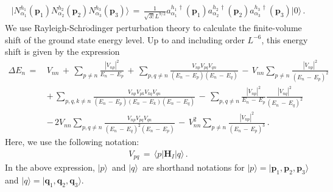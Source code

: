 \documentclass[12pt,prd,tightenlines,nofootinbib]{revtex4-2}
\begin{document}
\begin{align}
  \big| N^{h_{1}}_{\alpha_{1}}(\textbf{p}_{1})N^{h_{2}}_{\alpha_{2}}(\textbf{p}_{2})
  N^{h_{3}}_{\alpha_{3}}(\textbf{p}_{3})\big\rangle \, =\, \frac{1}{\sqrt{3!}L^{9/2}}
  a^{h_{1}\,\dagger}_{\alpha_{1}}(\textbf{p}_{1})a^{h_{2}\,\dagger}_{\alpha_{2}}(\textbf{p}_{2})a^{h_{3}\,\dagger}_{\alpha_{3}}(\textbf{p}_{3})\big| 0 \big\rangle\,.
\end{align}
We use Rayleigh-Schr$\ddot{\text{o}}$dinger perturbation theory to calculate
the finite-volume shift of the ground state energy level. Up to and including
order $L^{-6}$, this energy shift is given by the expression
\begin{align}
    \Delta E_{n}\, =\, &V_{nn}\, + \, \sum_{p \neq n} \frac{|V_{np}|^{2}}{E_{n} \, -\, E_{p}} \, +\, \sum_{p,q\neq n}\frac{V_{np}V_{pq}V_{qn}}{(E_{n}\,-\,E_{p})(E_{n}\,-\,E_{q})}\, -\, V_{nn} \sum_{p \neq n} \frac{|V_{np}|^{2}}{(E_{n} \, -\, E_{p})^{2}}\nonumber\\[2mm]
    &+ \, \sum_{p,q,k \neq n}\frac{V_{np}V_{pk}V_{kq}V_{qn}}{(E_{n} \, -\, E_{p})(E_{n} \, -\, E_{k})(E_{n} \, -\, E_{q})} \,-\, \sum_{p,q\neq n}\frac{|V_{np}|^{2}}{E_{n} \, -\, E_{p}}\frac{|V_{nq}|^{2}}{(E_{n} \, -\, E_{q})^{2}}\nonumber\\[2mm]
    &-\, 2V_{nn}\sum_{p,q\neq n}\frac{V_{np}V_{pq}V_{qn}}{(E_{n}\,-\, E_{q})^{2}(E_{n}\,-\, E_{p})}\,
    -\, V_{nn}^{2}\sum_{p\neq n}\frac{|V_{np}|^{2}}{(E_{n}\,-\, E_{p})^{3}}\,.
\end{align}
Here, we use the following notation:
\begin{align}
    V_{pq}\, =\, \langle  p | \textbf{H}_{I} |  q \rangle\,.
\end{align}
In the above expression, $|p\rangle\,$ and $|q\rangle\,$
are shorthand notations for
$|p\rangle = | \textbf{p}_{1},\textbf{p}_{2}, \textbf{p}_{3}\rangle$
and
$|q\rangle = | \textbf{q}_{1},\textbf{q}_{2}, \textbf{q}_{3}\rangle$.
\end{document}
